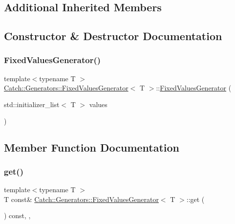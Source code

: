 \subsection*{Additional Inherited Members}


\subsection{Constructor \& Destructor Documentation}
\mbox{\label{class_catch_1_1_generators_1_1_fixed_values_generator_a6e9f473655413c1cb15f079890f06b86}} 
\subsubsection{\texorpdfstring{FixedValuesGenerator()}{FixedValuesGenerator()}}
{\footnotesize\ttfamily template$<$typename T $>$ \\
\mbox{\hyperlink{class_catch_1_1_generators_1_1_fixed_values_generator}{Catch\+::\+Generators\+::\+Fixed\+Values\+Generator}}$<$ T $>$\+::\mbox{\hyperlink{class_catch_1_1_generators_1_1_fixed_values_generator}{Fixed\+Values\+Generator}} (\begin{DoxyParamCaption}\item[{std\+::initializer\+\_\+list$<$ T $>$}]{values }\end{DoxyParamCaption})\hspace{0.3cm}{\ttfamily [inline]}}



\subsection{Member Function Documentation}
\mbox{\label{class_catch_1_1_generators_1_1_fixed_values_generator_ad2ea8c959c600386bcc4b2656b40d33e}} 
\subsubsection{\texorpdfstring{get()}{get()}}
{\footnotesize\ttfamily template$<$typename T $>$ \\
T const\& \mbox{\hyperlink{class_catch_1_1_generators_1_1_fixed_values_generator}{Catch\+::\+Generators\+::\+Fixed\+Values\+Generator}}$<$ T $>$\+::get (\begin{DoxyParamCaption}{ }\end{DoxyParamCaption}) const\hspace{0.3cm}{\ttfamily [inline]}, {\ttfamily [override]}, {\ttfamily [virtual]}}



